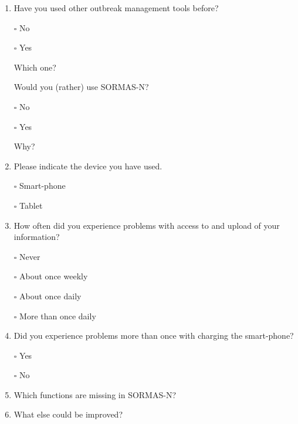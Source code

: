 \documentclass[a4paper, titlepage]{tufte-handout}
\begin{document}
\begin{enumerate}
\item Have you used other outbreak management tools before? 

\quad $\square$ No

\quad $\square$ Yes

\quad \quad Which one? 

\quad \quad \hrulefill

\quad \quad Would you (rather) use SORMAS-N?  

\quad \quad \quad $\square$ No

\quad \quad \quad $\square$ Yes

\quad \quad \quad Why?

\quad \quad \quad \hrulefill

\quad \quad \quad \hrulefill

\item Please indicate the device you have used.

\quad $\square$ Smart-phone 

\quad $\square$ Tablet

\item How often did you experience problems with access to and upload of your information?

\quad $\square$ Never

\quad $\square$ About once weekly

\quad $\square$ About once daily

\quad $\square$ More than once daily

\item Did you experience problems more than once with charging the smart-phone?

\quad $\square$ Yes

\quad $\square$ No

\item Which functions are missing in SORMAS-N?

\hrulefill

\hrulefill

\hrulefill

\hrulefill

\hrulefill

\item What else could be improved? 

\hrulefill

\hrulefill

\hrulefill

\hrulefill

\hrulefill
\end{enumerate}
\end{document}
